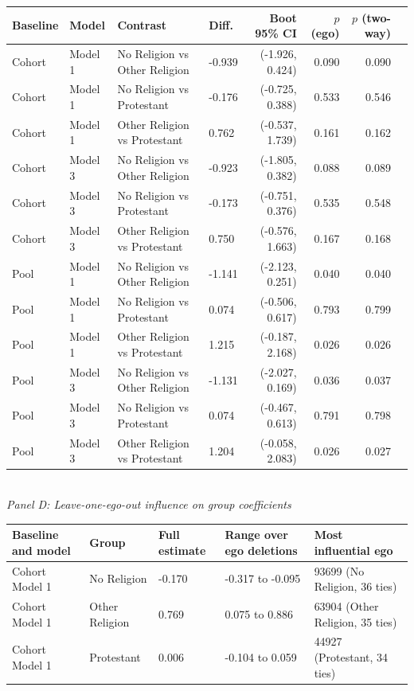 \begin{table}[htbp]
\begin{tabular}{llllrrrr}
\toprule
Baseline & Model & Contrast & Diff. & Boot 95\% CI & $p$ (ego) & $p$ (two-way) \\
\midrule
Cohort & Model 1 & No Religion vs Other Religion & -0.939 & (-1.926, 0.424) & 0.090 & 0.090 \\
Cohort & Model 1 & No Religion vs Protestant & -0.176 & (-0.725, 0.388) & 0.533 & 0.546 \\
Cohort & Model 1 & Other Religion vs Protestant & 0.762 & (-0.537, 1.739) & 0.161 & 0.162 \\
Cohort & Model 3 & No Religion vs Other Religion & -0.923 & (-1.805, 0.382) & 0.088 & 0.089 \\
Cohort & Model 3 & No Religion vs Protestant & -0.173 & (-0.751, 0.376) & 0.535 & 0.548 \\
Cohort & Model 3 & Other Religion vs Protestant & 0.750 & (-0.576, 1.663) & 0.167 & 0.168 \\
Pool & Model 1 & No Religion vs Other Religion & -1.141 & (-2.123, 0.251) & 0.040 & 0.040 \\
Pool & Model 1 & No Religion vs Protestant & 0.074 & (-0.506, 0.617) & 0.793 & 0.799 \\
Pool & Model 1 & Other Religion vs Protestant & 1.215 & (-0.187, 2.168) & 0.026 & 0.026 \\
Pool & Model 3 & No Religion vs Other Religion & -1.131 & (-2.027, 0.169) & 0.036 & 0.037 \\
Pool & Model 3 & No Religion vs Protestant & 0.074 & (-0.467, 0.613) & 0.791 & 0.798 \\
Pool & Model 3 & Other Religion vs Protestant & 1.204 & (-0.058, 2.083) & 0.026 & 0.027 \\
\bottomrule
\end{tabular}
\\[8pt]
\textit{Panel D: Leave-one-ego-out influence on group coefficients}\\[2pt]
\begin{tabular}{lllll}
\toprule
Baseline and model & Group & Full estimate & Range over ego deletions & Most influential ego \\
\midrule
Cohort Model 1 & No Religion & -0.170 & -0.317 to -0.095 & 93699 (No Religion, 36 ties) \\
Cohort Model 1 & Other Religion & 0.769 & 0.075 to 0.886 & 63904 (Other Religion, 35 ties) \\
Cohort Model 1 & Protestant & 0.006 & -0.104 to 0.059 & 44927 (Protestant, 34 ties) \\

\end{tabular}
\end{table}
